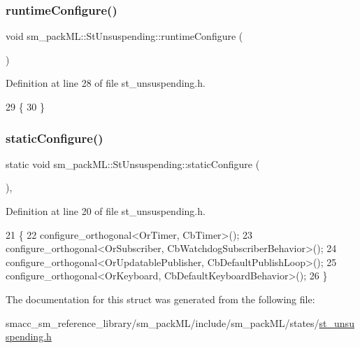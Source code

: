 \subsubsection{\texorpdfstring{runtime\+Configure()}{runtimeConfigure()}}
{\footnotesize\ttfamily void sm\+\_\+pack\+M\+L\+::\+St\+Unsuspending\+::runtime\+Configure (\begin{DoxyParamCaption}{ }\end{DoxyParamCaption})\hspace{0.3cm}{\ttfamily [inline]}}



Definition at line 28 of file st\+\_\+unsuspending.\+h.


\begin{DoxyCode}
29     \{
30     \}
\end{DoxyCode}
\mbox{\label{structsm__packML_1_1StUnsuspending_a1d0786e13bbfe99d470bed2ff98874ec}} 
\subsubsection{\texorpdfstring{static\+Configure()}{staticConfigure()}}
{\footnotesize\ttfamily static void sm\+\_\+pack\+M\+L\+::\+St\+Unsuspending\+::static\+Configure (\begin{DoxyParamCaption}{ }\end{DoxyParamCaption})\hspace{0.3cm}{\ttfamily [inline]}, {\ttfamily [static]}}



Definition at line 20 of file st\+\_\+unsuspending.\+h.


\begin{DoxyCode}
21     \{
22         configure\_orthogonal<OrTimer, CbTimer>();   
23         configure\_orthogonal<OrSubscriber, CbWatchdogSubscriberBehavior>();
24         configure\_orthogonal<OrUpdatablePublisher, CbDefaultPublishLoop>();
25         configure\_orthogonal<OrKeyboard, CbDefaultKeyboardBehavior>();
26     \}
\end{DoxyCode}


The documentation for this struct was generated from the following file\+:\begin{DoxyCompactItemize}
\item 
smacc\+\_\+sm\+\_\+reference\+\_\+library/sm\+\_\+pack\+M\+L/include/sm\+\_\+pack\+M\+L/states/\hyperlink{st__unsuspending_8h}{st\+\_\+unsuspending.\+h}\end{DoxyCompactItemize}

